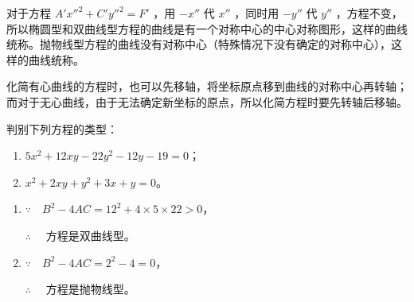 对于方程 $A'x''^2+C'y''^2=F'$ ，用 $-x''$ 代 $x''$ ，同时用 $-y''$ 代 $y''$ ，方程不变，所以椭圆型和双曲线型方程的曲线是有一个对称中心的中心对称图形，这样的曲线统称。抛物线型方程的曲线没有对称中心（特殊情况下没有确定的对称中心），这样的曲线统称。

化简有心曲线的方程时，也可以先移轴，将坐标原点移到曲线的对称中心再转轴；而对于无心曲线，由于无法确定新坐标的原点，所以化简方程时要先转轴后移轴。

\begin{example}
  判别下列方程的类型：
  \begin{enumerate}
    \item $5x^2+12xy-22y^2-12y-19=0$；
    \item $x^2+2xy+y^2+3x+y=0$。
  \end{enumerate}
\end{example}
\begin{solution}
  \begin{enumerate}
    \item $\because\quad B^2-4AC=12^2+4\times5\times22>0$，
    
    $\therefore\quad$ 方程是双曲线型。
    \item $\because\quad B^2-4AC=2^2-4=0$，
    
    $\therefore\quad$ 方程是抛物线型。
  \end{enumerate}
\end{solution}

